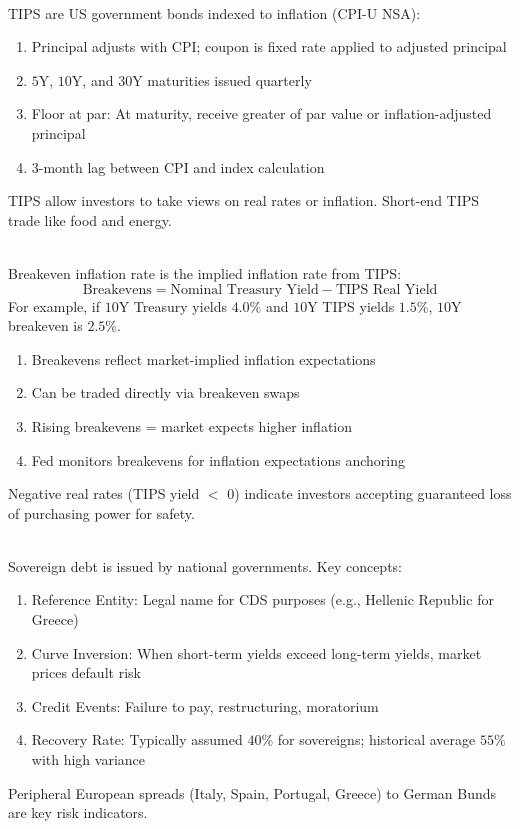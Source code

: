 \begin{remark} \\
TIPS are US government bonds indexed to inflation (CPI-U NSA):
\begin{enumerate}[label=\roman*.]
\setlength{\itemsep}{0pt}
\item Principal adjusts with CPI; coupon is fixed rate applied to adjusted principal
\item $5$Y, $10$Y, and $30$Y maturities issued quarterly
\item Floor at par: At maturity, receive greater of par value or inflation-adjusted principal
\item $3$-month lag between CPI and index calculation
\end{enumerate}
TIPS allow investors to take views on real rates or inflation. Short-end TIPS trade like food and energy.
\end{remark}

\begin{remark} \\
Breakeven inflation rate is the implied inflation rate from TIPS:
\begin{equation*}
\text{Breakevens} = \text{Nominal Treasury Yield} - \text{TIPS Real Yield}
\end{equation*}
For example, if $10$Y Treasury yields $4.0\%$ and $10$Y TIPS yields $1.5\%$, $10$Y breakeven is $2.5\%$.
\begin{enumerate}[label=\roman*.]
\setlength{\itemsep}{0pt}
\item Breakevens reflect market-implied inflation expectations
\item Can be traded directly via breakeven swaps
\item Rising breakevens = market expects higher inflation
\item Fed monitors breakevens for inflation expectations anchoring
\end{enumerate}
Negative real rates (TIPS yield $<$ 0) indicate investors accepting guaranteed loss of purchasing power for safety.
\end{remark}

\begin{remark} \\
Sovereign debt is issued by national governments. Key concepts:
\begin{enumerate}[label=\roman*.]
\setlength{\itemsep}{0pt}
\item Reference Entity: Legal name for CDS purposes (e.g., Hellenic Republic for Greece)
\item Curve Inversion: When short-term yields exceed long-term yields, market prices default risk
\item Credit Events: Failure to pay, restructuring, moratorium
\item Recovery Rate: Typically assumed $40\%$ for sovereigns; historical average $55\%$ with high variance
\end{enumerate}
Peripheral European spreads (Italy, Spain, Portugal, Greece) to German Bunds are key risk indicators.
\end{remark}

